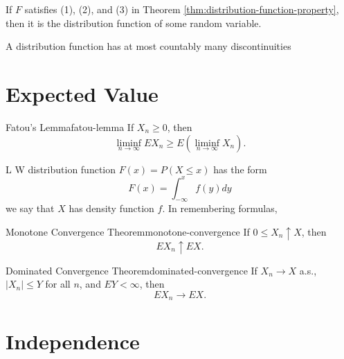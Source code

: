 \begin{theorem}{}{}
    If $F$ satisfies (1), (2), and (3) in Theorem \ref{thm:distribution-function-property}, then it is the distribution function of some random variable.
\end{theorem}

\begin{theorem}{}{}
    A distribution function has at most countably many discontinuities
\end{theorem}

\section{Expected Value}

\begin{theorem}{Fatou's Lemma}{fatou-lemma}
    If $X_n \geq 0$, then
    \begin{equation}
        \liminf _{n \rightarrow \infty} E X_{n} \geq E\left(\liminf _{n \rightarrow \infty} X_{n}\right).
    \end{equation}
\end{theorem}

\begin{theorem}L{}{}
    W distribution function $F(x)=P(X \leq x)$ has the form
\begin{equation*}
F(x)=\int_{-\infty}^{x} f(y) d y
\end{equation*}
we say that $X$ has density function $f$. In remembering formulas,
\end{theorem}

\begin{theorem}{Monotone Convergence Theorem}{monotone-convergence}
    If $0 \leq X_{n} \uparrow X$, then
    \begin{equation}
        E X_{n} \uparrow E X.
    \end{equation}
\end{theorem}

\begin{theorem}{Dominated Convergence Theorem}{dominated-convergence}
    If $X_{n} \rightarrow X$ a.s., $\left|X_{n}\right| \leq Y$ for all $n$, and $E Y<\infty$, then
    \begin{equation}
        E X_{n} \rightarrow E X.
    \end{equation}
\end{theorem}

\section{Independence}

